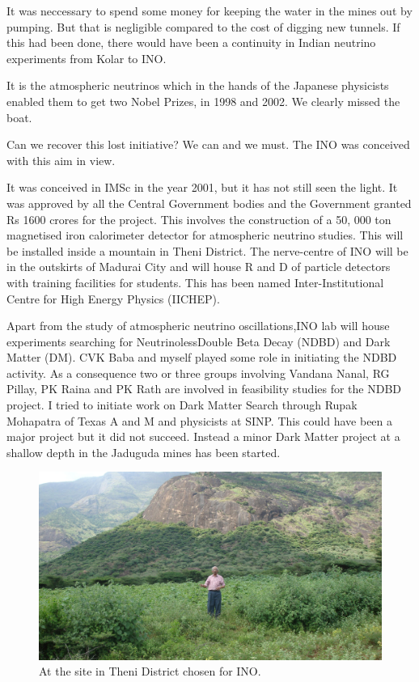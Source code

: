 It was neccessary to spend some money for keeping the water in the mines 
out by pumping. But that is negligible compared to the cost of digging 
new tunnels. If this had been done, there would have been a continuity 
in Indian neutrino experiments from Kolar to INO.
\medskip

It is the atmospheric neutrinos which in the hands of the Japanese 
physicists enabled them to get two Nobel Prizes, in 1998 and 2002. We 
clearly missed the boat.
\medskip

Can we recover this lost initiative? We can and we must. The INO was 
conceived with this aim in view.
\medskip

It was conceived in IMSc in the year 2001, but it has not still seen the 
light. It was approved by all the Central Government bodies and the 
Government granted Rs 1600 crores for the project. This involves the 
construction of a 50, 000 ton magnetised iron calorimeter detector for 
atmospheric neutrino studies. This will be installed inside a mountain 
in Theni District. The nerve-centre of INO will be in the outskirts of 
Madurai City and will house R and D of particle detectors with training 
facilities for students. This has been named Inter-Institutional Centre 
for High Energy Physics (IICHEP).
\medskip

Apart from the study of atmospheric neutrino oscillations,\break INO lab will 
house experiments searching for Neutrinoless\break Double Beta Decay (NDBD) 
and Dark Matter (DM). CVK Baba and myself played some role in initiating 
the NDBD activity. As a consequence two or three groups involving 
Vandana Nanal, RG Pillay, PK Raina and PK Rath are involved in 
feasibility studies for the NDBD project. I tried to initiate work on 
Dark Matter Search through Rupak Mohapatra of Texas A and M and 
physicists at SINP. This could have been a major project but it did not 
succeed. Instead a minor Dark Matter project at a shallow depth in the 
Jaduguda mines has been started.
\medskip

\begin{figure}[h]
\centering
\includegraphics[width=\textwidth]{images/Rajaji-ino.jpg}
\caption{At the site in Theni District chosen for INO.}  
\end{figure}
\smallskip

